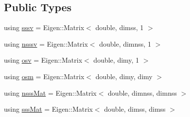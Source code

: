 \subsection*{Public Types}
\begin{DoxyCompactItemize}
\item 
using \hyperlink{classmsl1__rbbpf_a6703c548bb85bbe8e5a6baa723e8f0bb}{sssv} = Eigen\+::\+Matrix$<$ double, dimss, 1 $>$
\item 
using \hyperlink{classmsl1__rbbpf_a7a938d1eb0d1db350b2f2f6804d58999}{nsssv} = Eigen\+::\+Matrix$<$ double, dimnss, 1 $>$
\item 
using \hyperlink{classmsl1__rbbpf_a23daf10ba0f0b6fead88bc83b4fa27a3}{osv} = Eigen\+::\+Matrix$<$ double, dimy, 1 $>$
\item 
using \hyperlink{classmsl1__rbbpf_a1282d71d4d1fc83fd5139ad51c549ecc}{osm} = Eigen\+::\+Matrix$<$ double, dimy, dimy $>$
\item 
using \hyperlink{classmsl1__rbbpf_a8dd96568dc27eddb553e9ff8bf4b3c64}{nsss\+Mat} = Eigen\+::\+Matrix$<$ double, dimnss, dimnss $>$
\item 
using \hyperlink{classmsl1__rbbpf_a6b6f080289374270272071e2e3175cd5}{sss\+Mat} = Eigen\+::\+Matrix$<$ double, dimss, dimss $>$
\end{DoxyCompactItemize}
